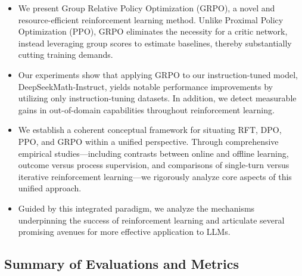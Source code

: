 \begin{itemize}[topsep=0pt]
    \item We present Group Relative Policy Optimization (GRPO), a novel and resource-efficient reinforcement learning method. Unlike Proximal Policy Optimization (PPO), GRPO eliminates the necessity for a critic network, instead leveraging group scores to estimate baselines, thereby substantially cutting training demands.
    \item Our experiments show that applying GRPO to our instruction-tuned model, DeepSeekMath-Instruct, yields notable performance improvements by utilizing only instruction-tuning datasets. In addition, we detect measurable gains in out-of-domain capabilities throughout reinforcement learning.
    \item We establish a coherent conceptual framework for situating RFT, DPO, PPO, and GRPO within a unified perspective. Through comprehensive empirical studies—including contrasts between online and offline learning, outcome versus process supervision, and comparisons of single-turn versus iterative reinforcement learning—we rigorously analyze core aspects of this unified approach.
    \item Guided by this integrated paradigm, we analyze the mechanisms underpinning the success of reinforcement learning and articulate several promising avenues for more effective application to LLMs.
\end{itemize}

\subsection{Summary of Evaluations and Metrics}

